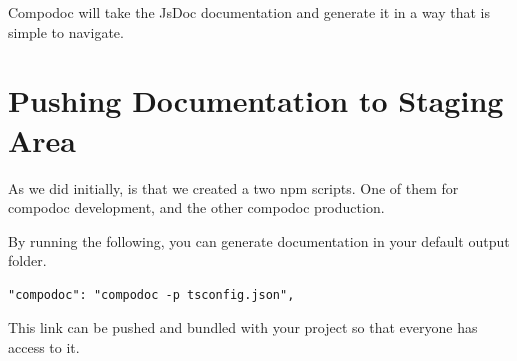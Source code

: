 Compodoc will take the JsDoc documentation and generate it in a way that is simple to navigate. 

\section{Pushing Documentation to Staging Area }
As we did initially, is that we created a two npm scripts. One of them for compodoc development, and the other compodoc production.

By running the following, you can generate documentation in your default output folder.
 
\begin{lstlisting}
"compodoc": "compodoc -p tsconfig.json",
\end{lstlisting}

This link can be pushed and bundled with your project so that everyone has access to it. 
